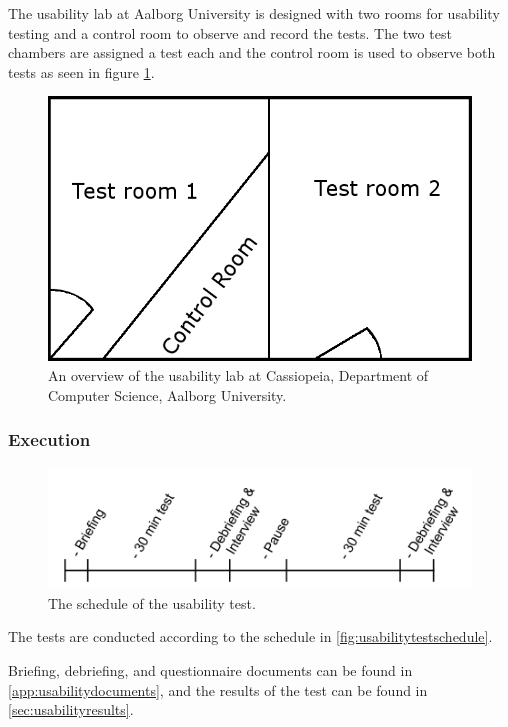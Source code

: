 The usability lab at Aalborg University is designed with two rooms for usability testing and a control room to observe and record the tests.
The two test chambers are assigned a test each and the control room is used to observe both tests as seen in figure \ref{fig:testsetup}.

\begin{figure}[H]
	\centering
		\includegraphics[width=\textwidth]{images/testSetup.png}
	\caption{An overview of the usability lab at Cassiopeia, Department of Computer Science, Aalborg University.}
	\label{fig:testsetup}
\end{figure}

\subsubsection*{Execution}

\begin{figure}[H]
	\centering
		\includegraphics[width=\textwidth]{images/usabilityTestSchedule.png}
	\caption{The schedule of the usability test.}
	\label{fig:usabilitytestschedule}
\end{figure}

The tests are conducted according to the schedule in \autoref{fig:usabilitytestschedule}.

Briefing, debriefing, and questionnaire documents can be found in \autoref{app:usabilitydocuments}, and the results of the test can be found in \autoref{sec:usabilityresults}.